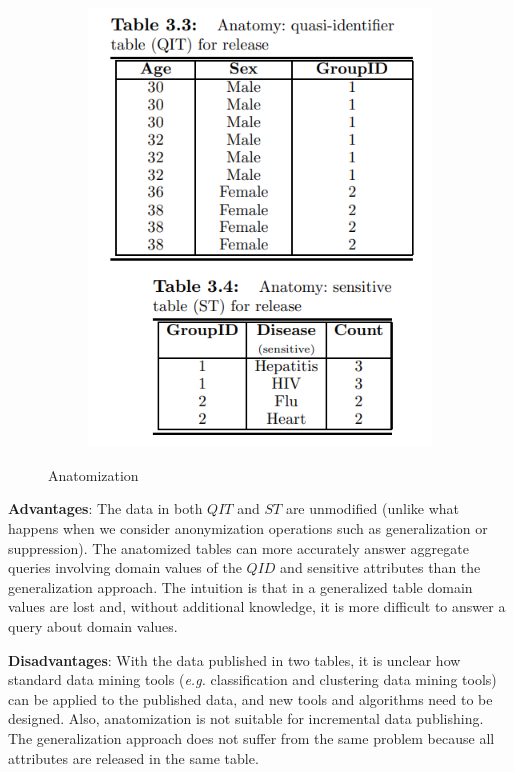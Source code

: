 \documentclass[a4paper, 11pt]{article}
\begin{document}
\begin{figure}[H]
\begin{subfigure}{.45\textwidth}
    \includegraphics[width=\textwidth]{img/fig02.png}
\end{subfigure}
\caption{Anatomization}
\label{fig:fig}
\end{figure}

\vspace{2\baselineskip}

\textbf{Advantages}: The data in both $QIT$ and $ST$ are unmodiﬁed (unlike what
happens when we consider anonymization operations such as generalization or suppression).
The anatomized tables can more accurately answer aggregate queries involving domain
values of the $QID$ and sensitive attributes than the generalization approach.
The intuition is that in a generalized table domain values are lost and, without
additional knowledge, it is more difficult to answer a query about domain values.

\textbf{Disadvantages}: With the data published in two tables, it is unclear how
standard data mining tools (\textit{e.g.} classiﬁcation and clustering data mining tools)
can be applied to the published data, and new tools and algorithms need to be designed.
Also, anatomization is not suitable for incremental data publishing. The generalization
approach does not suﬀer from the same problem because all attributes are released
in the same table.
\end{document}
